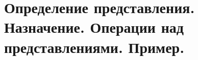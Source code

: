 {
	\section{Определение представления. Назначение. Операции над представлениями. Пример.}
	\newpage
}
